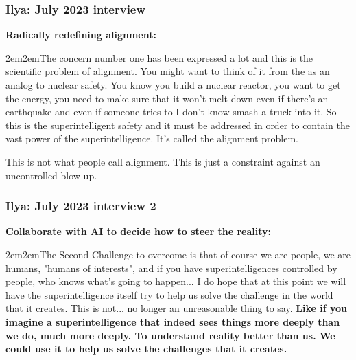\documentclass{beamer}
\newenvironment{customquote}
  {\begin{adjustwidth}{2em}{2em}\noindent\textnormal}
  {\end{adjustwidth}}
\begin{document}
\begin{frame}

  \frametitle{Ilya: July 2023 interview}

{\bf Radically redefining alignment:}\\[2ex]

\begin{customquote}
The concern number one has been expressed a lot and this is the scientific problem of alignment. You might want to think of it from the as an analog to nuclear safety. You know you build a nuclear reactor, you want to get the energy, you need to make sure that it won't melt down even if there's an earthquake and even if someone tries to I don't know smash a truck into it. So this is the superintelligent safety and it must be addressed in order to contain the vast power of the superintelligence. It's called the alignment problem.\\[2ex]
\end{customquote}

This is not what people call alignment. This is just a constraint against an uncontrolled blow-up.

\end{frame}

\begin{frame}

  \frametitle{Ilya: July 2023 interview 2}

{\bf Collaborate with AI to decide how to steer the reality:}\\[2ex]

\begin{customquote}
The Second Challenge to overcome is that of course we are people, we are humans, "humans of interests", and if you have superintelligences controlled by people, who knows what's going to happen... I do hope that at this point we will have the superintelligence itself try to help us solve the challenge in the world that it creates. This is not... no longer an unreasonable thing to say. {\bf Like if you imagine a superintelligence that indeed sees things more deeply than we do, much more deeply. To understand reality better than us. We could use it to help us solve the challenges that it creates.}\\[2ex]
\end{customquote}

\end{frame}
\end{document}
